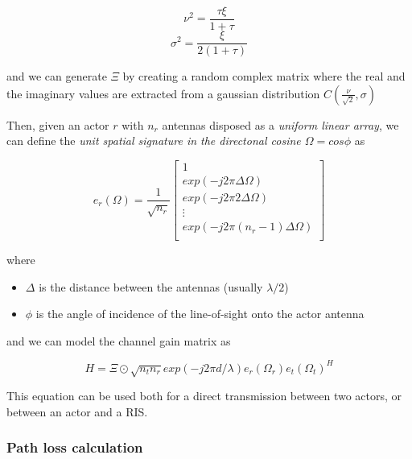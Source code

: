 \begin{equation}
  \nu^2 = \frac{\tau \xi}{1 + \tau}
\end{equation}
\begin{equation}
  \sigma^2 = \frac{\xi}{2(1 + \tau)}
\end{equation}

and we can generate $\Xi$ by creating a random complex matrix where the real and the imaginary values are extracted from a gaussian distribution $C(\frac{\nu}{\sqrt{2}}, \sigma)$ \cite{Rice_distribution}

Then, given an actor $r$ with $n_r$ antennas disposed as a \textit{uniform linear array}, we can define the \textit{unit spatial signature in the directonal cosine $\Omega = cos \phi$} \cite{Fundamentals_Wireless_Communication_chapter7} as

\begin{equation}
  e_r(\Omega) = \frac{1}{\sqrt{n_r}}
  \begin{bmatrix}
    1                                \\
    exp(-j2\pi\Delta\Omega)          \\
    exp(-j2\pi2\Delta\Omega)         \\
    \vdots                           \\
    exp(-j2\pi(n_r - 1)\Delta\Omega) \\
  \end{bmatrix}
\end{equation}

where
\begin{itemize}
  \item $\Delta$ is the distance between the antennas (usually $\lambda / 2$)
  \item $\phi$ is the angle of incidence of the line-of-sight onto the actor antenna
\end{itemize}

and we can model the channel gain matrix \cite{Fundamentals_Wireless_Communication_chapter7} as

\begin{equation}
  H = \Xi \odot \sqrt{n_t n_r} exp(-j2 \pi d / \lambda) e_r(\Omega_r) e_t(\Omega_t)^H
\end{equation}

This equation can be used both for a direct transmission between two actors, or between an actor and a RIS.

\subsubsection{Path loss calculation}

